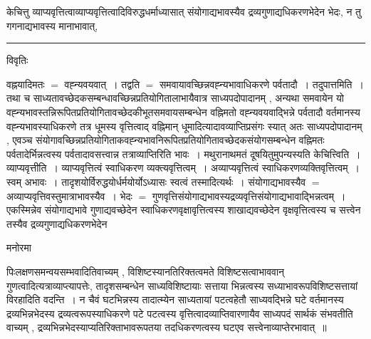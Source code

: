 \documentclass[10pt, openany]{book}
\begin{document}
{{{\la केचित्तु} व्याप्यवृत्तित्वाव्याप्यवृत्तित्वादिविरुद्धधर्माध्यासात् संयोगाद्यभावस्यैव द्रव्यगुणाद्यधिकरणभेदेन भेदः, न तु गगनाद्यभावस्य मानाभावात्,}\\
\hrule
\begin{center}     विवृतिः \end{center}
वह्नयादिमतः $=$ वह्न्यवयवात्~। तद्वति $=$ समवायावच्छिन्नवह्न्यभावाधिकरणे पर्वतादौ~। तदुपात्तमिति~। तथा च साध्यतावच्छेदकसम्बन्धावच्छिन्नप्रतियोगितालाभायैवात्र साध्यपदोपादानम् , अन्यथा समवायेन यो वह्न्यभावस्तन्निरूपितप्रतियोगितावच्छेदकीभूतसमवायसम्बन्धेन वह्निमतो वह्न्यवयवाद्भिन्ने पर्वतादौ
वर्तमानस्य वह्न्यभावस्याधिकरणे तत्र धूमस्य वृत्तित्वाद् वह्निमान् धूमादित्यादावव्याप्तिप्रसंगः स्यात् अतः साध्यपदोपादानम् , एवञ्च
संयोगावच्छिन्नप्रतियोगिताकवह्न्यभावनिरूपितप्रतियोगितावच्छेदकसंयोगसम्बन्धेन वह्निमतः पर्वतादेर्भिन्नत्वस्य पर्वतादावसत्त्वान्न तत्राव्याप्तिरिति भावः~। मथुरानाथमतं
दूषयितुमुपन्यस्यति केचित्त्विति~। व्याप्यवृत्तीति~। व्याप्यवृत्तित्वं स्वाधिकरण व्यक्त्यवृत्तित्वम्~। अव्याप्यवृत्तित्वं स्वाधिकरणव्यक्तिवृत्तित्वम्~। स्वम् अभावः~।
तादृशयोर्विरुद्धयोर्धर्मयोर्योऽध्यासः स्वत्वं तस्मादित्यर्थः~। संयोगाद्यभावस्यैव $=$ अव्याप्यवृत्तिवस्तुमात्राभावस्यैव~। भेदः $=$ गुणवृत्तिसंयोगाद्यभावस्यद्रव्यवृत्तिसंयोगाद्यभावाद्भिन्नत्वम्~। एकस्मिन्नेव संयोगाद्यभावे गुणाद्यवच्छेदेन स्वाधिकरणवृक्षावृत्तित्वस्य शाखाद्यवच्छेदेन वृक्षवृत्तित्वस्य च सत्त्वेन तस्यैव द्रव्यगुणाद्यधिकरणभेदेन
\begin{center}   मनोरमा  \end{center}

पिःलक्षणसमन्वयसम्भवादितिवाच्यम् , विशिष्टस्यानतिरिक्तत्वमते विशिष्टसत्वाभाववान् गुणत्वादित्यत्राव्याप्त्यापत्तेः, तादृशसम्बन्धेन साध्यविशिष्टायाः सत्ताया भिन्नत्वस्य सध्याभावरूपविशिष्टसत्तायां विरहादिति वदन्ति~। न चैवं घटभिन्नस्य तादात्म्येन साध्यतायां पटत्वहेतौ साध्यवद्भिन्ने घटे वर्तमानस्य द्रव्यभिन्नभेदस्य द्रव्यत्वरूपस्याधिकरणे
पटे पटत्वस्य वृत्तित्वादव्याप्तिवारणायैव साध्यपदं सार्थकं संभवतीति वाच्यम् , द्रव्यभिन्नभेदस्याप्यतिरिक्ताभावरूपतया तदधिकरणत्वस्य घटएव सत्त्वेनाव्याप्तेरभावात्~॥\\

}
\end{document}
